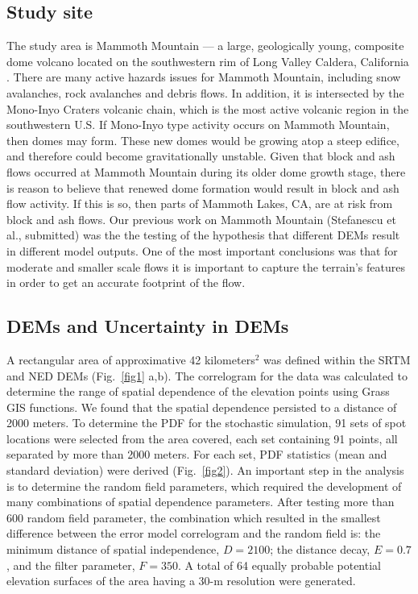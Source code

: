 \documentclass[a4paper,fleqn]{article}
\begin{document}
\subsection{Study site}

The study area is Mammoth Mountain --- a large, geologically young,
composite dome volcano located on the southwestern rim of Long Valley
Caldera, California \citep{Bailey1989}.  There are many active hazards
issues for Mammoth Mountain, including snow avalanches, rock
avalanches and debris flows. In addition, it is intersected by the
Mono-Inyo Craters volcanic chain, which is the most active volcanic
region in the southwestern U.S.  If Mono-Inyo type activity occurs on
Mammoth Mountain, then domes may form.  These new domes would be
growing atop a steep edifice, and therefore could become
gravitationally unstable.  Given that block and ash flows occurred at
Mammoth Mountain during its older dome growth stage, there is reason
to believe that renewed dome formation would result in block and ash
flow activity. If this is so, then parts of Mammoth Lakes, CA, are at
risk from block and ash flows.  Our previous work on Mammoth Mountain
(Stefanescu et al., submitted) was the the testing of the hypothesis
that different DEMs result in different model outputs. One of the most
important conclusions was that for moderate and smaller scale flows it
is important to capture the terrain's features in order to get an
accurate footprint of the flow.

\subsection{DEMs and Uncertainty in DEMs}

A rectangular area of approximative 42 kilometers$^2$ was defined
within the SRTM and NED DEMs (Fig.~\ref{fig1} a,b). The correlogram for the data 
was calculated to determine the range of spatial dependence of the elevation points using
Grass GIS functions. We found that the spatial dependence persisted to a distance of 2000 meters.
To determine the PDF for the stochastic simulation, 91 sets of spot locations were selected from the 
area covered, each set containing 91 points, all separated by more than 2000 meters. For each set,
PDF statistics (mean and standard deviation) were derived (Fig.~\ref{fig2}). An important step in
the analysis is to determine the random field parameters, which
required the development of many combinations of spatial dependence
parameters. After testing more than 600 random field parameter, the
combination which resulted in the smallest difference between the
error model correlogram and the random field is: the minimum distance
of spatial independence, $D =2100$; the distance decay, $E = 0.7$, and
the filter parameter, $F =350$. A total of 64 equally probable
potential elevation surfaces of the area having a 30-m resolution were
generated.
\end{document}
